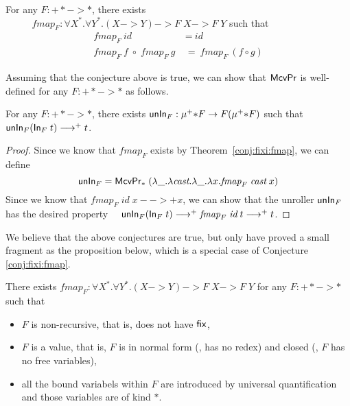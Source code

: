 \begin{conjecture}\label{conj:fixi:fmap}
For any $F : +* -> *$, there exists\\ \vspace*{-1ex}
$\phantom{A}\qquad
	\textit{fmap}_F : \forall X^{*}.\forall Y^{*}.(X -> Y) -> F\;X -> F\;Y$
\quad such that
\begin{align*}
\textit{fmap}_F~\textit{id} &~=~ \textit{id} \\
\textit{fmap}_F~\textit{f} \;\circ\; \textit{fmap}_F~\textit{g}
&~=~ \textit{fmap}_F~(f\circ g)
\end{align*}
\end{conjecture}
\noindent
Assuming that the conjecture above is true,
we can show that $\mathsf{McvPr}$ is well-defined for any $F: +* -> *$ as follows.
\begin{conjecture} For any $F : +* -> *$, there exists
$\mathsf{unIn}_F : \mu^{+}{*} F -> F(\mu^{+}{*} F)$ such that
$\mathsf{unIn}_F (\mathsf{In}_F\;t) -->+ t$.
\end{conjecture}
\begin{proof}
Since we know that $\textit{fmap}_F$ exists by Theorem~\ref{conj:fixi:fmap},
we can define
\[ \mathsf{unIn}_F = \mathsf{McvPr}_{*}\;
            (\lambda\_.\lambda\textit{cast}.\lambda\_.\lambda x.\textit{fmap}_F\;\textit{cast}\;x)
\]
Since we know that $\textit{fmap}_F\;\textit{id}\;x -->+ x$,
we can show that the unroller $\mathsf{unIn}_F$ has the desired property
$\quad \mathsf{unIn}_F (\mathsf{In}_F\;t) -->+ \textit{fmap}_F\;\textit{id}\;t -->+ t $.
\end{proof}
We believe that the above conjectures are true, but only have proved
a small fragment as the proposition below, which is a special case
of Conjecture \ref{conj:fixi:fmap}.
\begin{proposition}\label{prop:fixi:fmapBaseCase}
There exists
$\textit{fmap}_F : \forall X^{*}.\forall Y^{*}.(X -> Y) -> F\;X -> F\;Y$
for any $F : +* -> *$ such that
\begin{itemize}
        \item $F$ is non-recursive, that is, does not have $\mathsf{fix}$,
        \item $F$ is a value, that is, $F$ is
                in normal form (\ie, has no redex) and
                closed (\ie, $F$ has no free variables),
        \item all the bound variabels within $F$ are
                introduced by universal quantification
                and those variables are of kind $*$.
\end{itemize}
\end{proposition}
